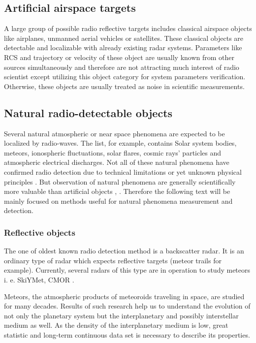 \documentclass[twoside]{ctuthesis}
\theoremstyle{plain}
\theoremstyle{definition}
\theoremstyle{note}
\begin{document}
\subsection{Artificial airspace targets}

A large group of possible radio reflective targets includes classical airspace objects like airplanes, unmanned aerial vehicles or satellites. These classical objects are detectable and localizable with already existing radar systems. Parameters like RCS and trajectory or velocity of these object are usually known from other sources simultaneously and therefore are not attracting much interest of radio scientist except utilizing this object category for system parameters verification. Otherwise, these objects are usually treated as noise in scientific measurements. 

\subsection{Natural radio-detectable objects}

Several natural atmospheric or near space phenomena are expected to be localized by radio-waves. The list, for example, contains Solar system bodies, meteors, ionospheric fluctuations, solar flares, cosmic rays' particles and atmospheric electrical discharges. Not all of these natural phenomena have confirmed radio detection due to technical limitations or yet unknown physical principles \cite{LOPES}.  But observation of natural phenomena are generally scientifically more valuable than artificial objects \cite{astro_particles}, \cite{LOFAR_showers}. Therefore the following text will be mainly focused on methods useful for natural phenomena measurement and detection. 

\subsubsection{Reflective objects}

The one of oldest known radio detection method is a backscatter radar. It is an ordinary type of radar which expects reflective targets (meteor trails for example). Currently, several radars of this type are in operation to study meteors i. e.  SkiYMet\cite{skiymet}, CMOR \cite{CMOR_radar}.

Meteors, the atmospheric products of meteoroids traveling in space, are studied for many decades. Results of such research help us to understand the evolution of not only the planetary system but the interplanetary and possibly interstellar medium \cite{interplanetary_medium} as well. As the density of the interplanetary medium is low, great statistic and long-term continuous data set is necessary to describe its properties. 
\end{document}
